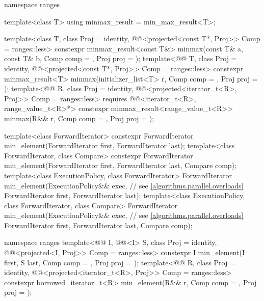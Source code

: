 \begin{codeblock}
{  namespace ranges {
    template<class T>
      using minmax_result = min_max_result<T>;

    template<class T, class Proj = identity,
             @@<projected<const T*, Proj>> Comp = ranges::less>
      constexpr minmax_result<const T&>
        minmax(const T& a, const T& b, Comp comp = {}, Proj proj = {});
    template<@@ T, class Proj = identity,
             @@<projected<const T*, Proj>> Comp = ranges::less>
      constexpr minmax_result<T>
        minmax(initializer_list<T> r, Comp comp = {}, Proj proj = {});
    template<@@ R, class Proj = identity,
             @@<projected<iterator_t<R>, Proj>> Comp = ranges::less>
      requires @@<iterator_t<R>, range_value_t<R>*>
      constexpr minmax_result<range_value_t<R>>
        minmax(R&& r, Comp comp = {}, Proj proj = {});
  }

  template<class ForwardIterator>
    constexpr ForwardIterator min_element(ForwardIterator first, ForwardIterator last);
  template<class ForwardIterator, class Compare>
    constexpr ForwardIterator min_element(ForwardIterator first, ForwardIterator last,
                                          Compare comp);
  template<class ExecutionPolicy, class ForwardIterator>
    ForwardIterator min_element(ExecutionPolicy&& exec,         // see \ref{algorithms.parallel.overloads}
                                ForwardIterator first, ForwardIterator last);
  template<class ExecutionPolicy, class ForwardIterator, class Compare>
    ForwardIterator min_element(ExecutionPolicy&& exec,         // see \ref{algorithms.parallel.overloads}
                                ForwardIterator first, ForwardIterator last,
                                Compare comp);

  namespace ranges {
    template<@@ I, @@<I> S, class Proj = identity,
             @@<projected<I, Proj>> Comp = ranges::less>
      constexpr I min_element(I first, S last, Comp comp = {}, Proj proj = {});
    template<@@ R, class Proj = identity,
             @@<projected<iterator_t<R>, Proj>> Comp = ranges::less>
      constexpr borrowed_iterator_t<R>
        min_element(R&& r, Comp comp = {}, Proj proj = {});
  }

}
\end{codeblock}
